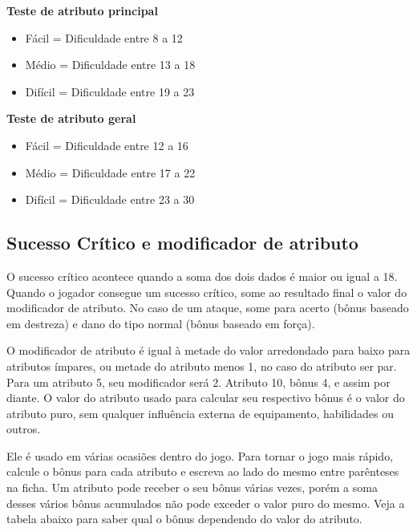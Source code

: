 \textbf{Teste de atributo principal}
\begin{itemize}
	\item Fácil = Dificuldade entre 8 a 12
	\item Médio = Dificuldade entre 13 a 18
	\item Difícil = Dificuldade entre 19 a 23
\end{itemize}

\textbf{Teste de atributo geral}
\begin{itemize}
	\item Fácil = Dificuldade entre 12 a 16 
	\item Médio = Dificuldade entre 17 a 22
	\item Difícil = Dificuldade entre 23 a 30
\end{itemize}

\subsection{Sucesso Crítico e modificador de atributo}

O sucesso crítico acontece quando a soma dos dois dados é maior ou igual a 18. Quando o jogador consegue um sucesso crítico, some ao resultado final o valor do modificador de atributo. No caso de um ataque, some para acerto (bônus baseado em destreza) e dano do tipo normal (bônus baseado em força).

O modificador de atributo é igual à metade do valor arredondado para baixo para atributos ímpares, ou metade do atributo menos 1, no caso do atributo ser par. Para um atributo 5, seu modificador será 2. Atributo 10, bônus 4, e assim por diante. O valor do atributo usado para calcular seu respectivo bônus é o valor do atributo puro, sem qualquer influência externa de equipamento, habilidades ou outros.

Ele é usado em várias ocasiões dentro do jogo. Para tornar o jogo mais rápido, calcule o bônus para cada atributo e escreva ao lado do mesmo entre parênteses na ficha. Um atributo pode receber o seu bônus várias vezes, porém a soma desses vários bônus acumulados não pode exceder o valor puro do mesmo. Veja a tabela abaixo para saber qual o bônus dependendo do valor do atributo.


